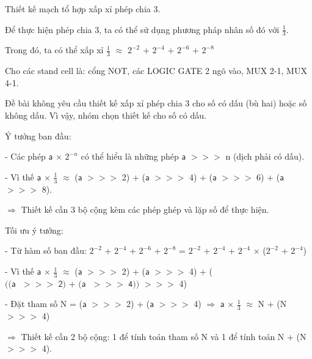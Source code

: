 
Thiết kế mạch tổ hợp xấp xỉ phép chia 3.

Để thực hiện phép chia 3, ta có thể sử dụng phương pháp nhân số đó với $\frac{1}{3}$.

Trong đó, ta có thể xấp xỉ $\frac{1}{3}$ $\approx$ $2^{-2}$ + $2^{-4}$ + $2^{-6}$ + $2^{-8}$

Cho các stand cell là: cổng NOT, các LOGIC GATE 2 ngõ vào, MUX 2-1, MUX 4-1.


Đề bài không yêu cầu thiết kế xấp xỉ phép chia 3 cho số có dấu (bù hai) hoặc số không dấu. Vì vậy, nhóm chọn thiết kế cho số có dấu.

Ý tưởng ban đầu:

- Các phép $\textsf{a}$ $\times$ $2^{-n}$ có thể hiểu là những phép $\textsf{a}$ $>>>$ n (dịch phải có dấu).

- Vì thế $\textsf{a}$ $\times$ $\frac{1}{3}$ $\approx$ ($\textsf{a}$ $>>>$ 2) + ($\textsf{a}$ $>>>$ 4) + ($\textsf{a}$ $>>>$ 6) + ($\textsf{a}$ $>>>$ 8).  

$\Rightarrow$ Thiết kế cần 3 bộ cộng kèm các phép ghép và lặp số để thực hiện.

\vspace{.5cm}

Tối ưu ý tưởng:

- Từ hàm số ban đầu: $2^{-2}$ + $2^{-4}$ + $2^{-6}$ + $2^{-8}$ = $2^{-2}$ + $2^{-4}$ + $2^{-4}$ $\times$ ($2^{-2}$ + $2^{-4}$)

- Vì thế $\textsf{a}$ $\times$ $\frac{1}{3}$ $\approx$ ($\textsf{a}$ $>>>$ 2) + ($\textsf{a}$ $>>>$ 4) + ($\textsf{(($\textsf{a}$ $>>>$ 2) + ($\textsf{a}$ $>>>$ 4))}$ $>>>$ 4)

- Đặt tham số N = ($\textsf{a}$ $>>>$ 2) + ($\textsf{a}$ $>>>$ 4) $\Rightarrow$ $\textsf{a}$ $\times$ $\frac{1}{3}$ $\approx$ N + (N $>>>$ 4)

$\Rightarrow$ Thiết kế cần 2 bộ cộng: 1 để tính toán tham số N và 1 để tính toán N + (N $>>>$ 4).

\vspace{.5cm}

